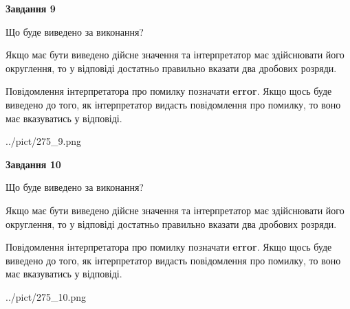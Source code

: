 \documentclass[12pt, ukrainian]{article}
\begin{document}
{\begin {Large}
{\begin {center}\textbf{Завдання 9}\end {center}}\par
Що буде виведено за виконання? \par

Якщо має бути виведено дійсне значення та інтерпретатор має здійснювати його округлення, 
то у відповіді достатньо правильно вказати два дробових розряди.

Повідомлення інтерпретатора про помилку позначати \textbf{error}.
Якщо щось буде виведено до того, як інтерпретатор видасть повідомлення про помилку, 
то воно має вказуватись у відповіді. \par

\begin{center}
	{../pict/275_9.png}
\end{center}
\newpage

{\begin {center}\textbf{Завдання 10}\end {center}}\par
Що буде виведено за виконання? \par

Якщо має бути виведено дійсне значення та інтерпретатор має здійснювати його округлення, 
то у відповіді достатньо правильно вказати два дробових розряди.

Повідомлення інтерпретатора про помилку позначати \textbf{error}.
Якщо щось буде виведено до того, як інтерпретатор видасть повідомлення про помилку, 
то воно має вказуватись у відповіді. \par

\begin{center}
	{../pict/275_10.png}
\end{center}
\newpage

\end {Large}}
\end{document}
